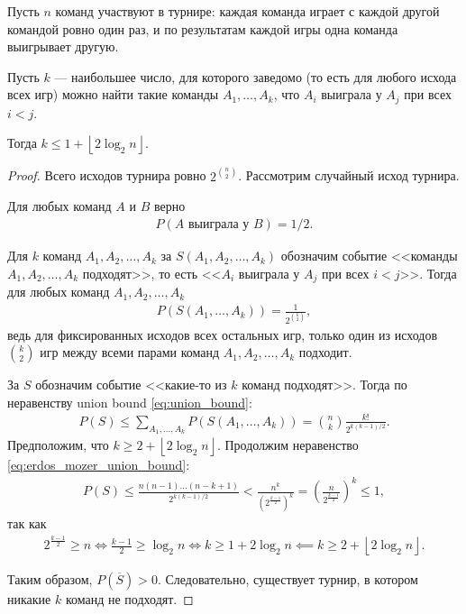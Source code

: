 \documentclass[../main.tex]{subfiles}
\begin{document}
\begin{thm}
 \label{thm:erdos_mozer}
 Пусть $ n $ команд  участвуют в турнире: каждая команда  играет с каждой другой командой ровно один раз, и по результатам каждой игры одна команда выигрывает другую.

 Пусть $k$ --- наибольшее число, для которого заведомо (то есть для любого исхода всех игр) можно найти такие команды  $A_1, \ldots, A_k$, что $A_i$ выиграла у $A_j$ при всех $i < j$.

 Тогда $k \leqslant 1 + \left\lfloor 2 \log_2 n  \right\rfloor$.
\end{thm}
\begin{proof}
 Всего исходов турнира ровно $ 2^{\binom n 2} $. Рассмотрим случайный исход турнира.

 Для любых команд $ A $ и $B $ верно
 \begin{align*}
  P(A \text{ выиграла у } B) = 1 / 2
 .\end{align*}

 Для $ k $ команд $A_1,A_2,\ldots,A_k$ за $ S(A_1, A_2, \ldots, A_k) $  обозначим событие <<команды $ A_1,A_2,\ldots,A_k $ подходят>>, то есть <<$ A_i $ выиграла у $ A_j $ при всех $ i < j $>>. Тогда для любых команд $ A_1,A_2,\ldots,A_k $ 
 \begin{align*}
  P(S(A_1,\ldots,A_k)) = \frac{1}{2^{\binom k 2}},
 \end{align*} ведь для фиксированных исходов всех остальных игр, только один из исходов $ \binom k 2 $ игр между всеми парами команд $ A_1,A_2,\ldots,A_k $  подходит.

 За $ S $ обозначим событие <<какие-то из $ k $ команд подходят>>. Тогда по неравенству union bound \eqref{eq:union_bound}:
 \begin{align}
  \label{eq:erdos_mozer_union_bound}
  P(S) \leqslant \sum_{A_1,\ldots,A_k} P(S(A_1,\ldots,A_k)) = \binom n k \frac{k!}{2^{k(k-1) / 2}}.
 \end{align} Предположим, что $ k \geqslant 2 + \left\lfloor 2\log_2 n \right\rfloor  $. Продолжим неравенство \eqref{eq:erdos_mozer_union_bound}:
 \begin{align*}
  P(S) \leqslant \frac{n (n-1) \ldots (n-k+1)}{2^{k(k-1) / 2}} < \frac{n^{k}}{\left(2^{\frac{k-1}{2}}\right)^{k}} = \left(\frac{n}{2^{\frac{k-1}{2}}}\right)^{k} \leqslant 1,
 \end{align*} так как
 \begin{align*}
  2^{\frac{k-1}{2}} \geqslant n \iff \frac{k-1}{2} \geqslant \log_2 n \iff k \geqslant 1 + 2  \log_2 n \impliedby k \geqslant 2 + \left\lfloor 2 \log_2 n \right\rfloor.
 \end{align*}

 Таким образом, $ P(\overline S) > 0$. Следовательно, существует турнир, в котором никакие $k$ команд не подходят.
\end{proof}
\end{document}
